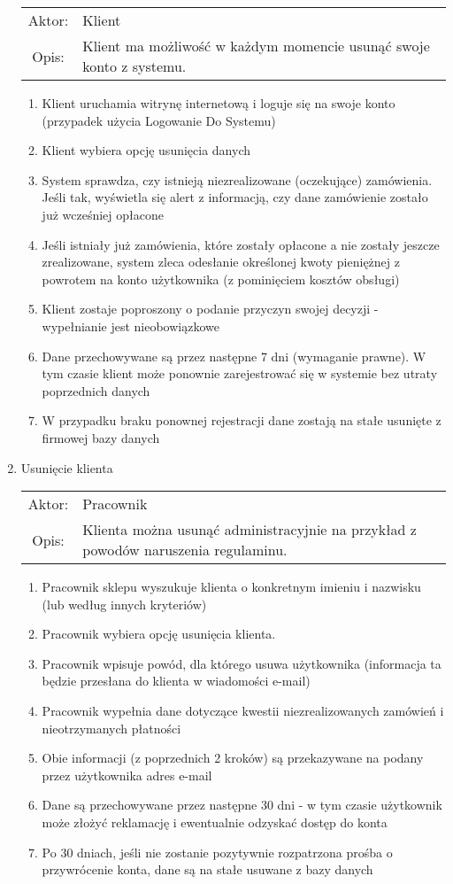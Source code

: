 \begin{enumerate}
\begin{tabularx}{\linewidth}{ c X }
  Aktor: & Klient \\
  Opis: & Klient ma możliwość w każdym momencie usunąć swoje konto z systemu.\\
  \end{tabularx}
  \begin{enumerate}
    \item Klient uruchamia witrynę internetową i loguje się na swoje konto
    (przypadek użycia Logowanie Do Systemu)
    \item Klient wybiera opcję usunięcia danych
    \item System sprawdza, czy istnieją niezrealizowane (oczekujące) zamówienia.
    Jeśli tak, wyświetla się alert z informacją, czy dane zamówienie zostało już
    wcześniej opłacone
    \item Jeśli istniały już zamówienia, które zostały opłacone a nie zostały
    jeszcze zrealizowane, system zleca odesłanie określonej kwoty pieniężnej z
    powrotem na konto użytkownika (z pominięciem kosztów obsługi)
    \item Klient zostaje poproszony o podanie przyczyn swojej decyzji -
    wypełnianie jest nieobowiązkowe
    \item Dane przechowywane są przez następne 7 dni (wymaganie prawne). W tym
    czasie klient może ponownie zarejestrować się w systemie bez utraty
    poprzednich danych
    \item W przypadku braku ponownej rejestracji dane zostają na stałe usunięte
    z firmowej bazy danych
  \end{enumerate}
  \item Usunięcie klienta \\
  \begin{tabularx}{\linewidth}{ c X }
  Aktor: & Pracownik \\
  Opis: & Klienta można usunąć administracyjnie na przykład z powodów
  naruszenia regulaminu.\\
  \end{tabularx}
  \begin{enumerate}
    \item Pracownik sklepu wyszukuje klienta o konkretnym imieniu i nazwisku
    (lub według innych kryteriów)
    \item Pracownik wybiera opcję usunięcia klienta. 
    \item Pracownik wpisuje powód, dla którego usuwa użytkownika (informacja ta
    będzie przesłana do klienta w wiadomości e-mail)
    \item Pracownik wypełnia dane dotyczące kwestii niezrealizowanych zamówień i
    nieotrzymanych płatności
    \item Obie informacji (z poprzednich 2 kroków) są przekazywane na podany
    przez użytkownika adres e-mail
    \item Dane są przechowywane przez następne 30 dni - w tym czasie użytkownik
    może złożyć reklamację i ewentualnie odzyskać dostęp do konta
    \item Po 30 dniach, jeśli nie zostanie pozytywnie rozpatrzona prośba o
    przywrócenie konta, dane są na stałe usuwane z bazy danych
  \end{enumerate}
\end{enumerate}